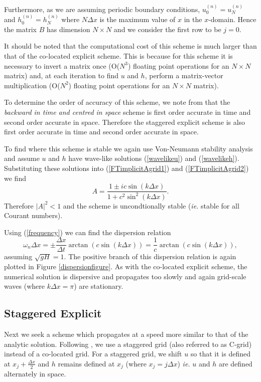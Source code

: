 \documentclass[a4paper, 10pt, notitlepage]{article}
\begin{document}
Furthermore, as we are assuming periodic boundary conditions, $u_{0}^{(n)} = u_{N}^{(n)}$ and $h_{0}^{(n)} = h_{N}^{(n)}$ where $N\Delta x$ is the maximum value of $x$ in the $x$-domain. Hence the matrix $B$ has dimension $N \times N$ and we consider the first row to be $j = 0$. 

It should be noted that the computational cost of this scheme is much larger than that of the co-located explicit scheme. This is because for this scheme it is necessary to invert a matrix once (O($N^{3}$) floating point operations for an $N \times N$ matrix) and, at each iteration to find $u$ and $h$, perform a matrix-vector multiplication (O($N^{2}$) floating point operations for an $N \times N$ matrix). 

To determine the order of accuracy of this scheme, we note from \cite{MPE textbook} that the \textit{backward in time and centred in space} scheme is first order accurate in time and second order accurate in space. Therefore the staggered explicit scheme is also first order accurate in time and second order accurate in space.

To find where this scheme is stable we again use Von-Neumann stability analysis and assume $u$ and $h$ have wave-like solutions (\ref{wavelikeu}) and (\ref{wavelikeh}). Substituting these solutions into (\ref{FTimplicitAgrid1}) and (\ref{FTimplicitAgrid2}) we find
\begin{equation}
A = \frac{1 \pm i c\sin(k\Delta x)}{1 + c^{2}\sin^{2}(k\Delta x)}.
\end{equation}
Therefore $\lvert A \rvert ^{2} < 1$ and the scheme is uncondtionally stable (\textit{ie.} stable for all Courant numbers). 

Using (\ref{frequency}) we can find the dispersion relation
\begin{equation}
\omega_{n} \Delta x = \pm\frac{\Delta x}{\Delta t} \arctan(c\sin(k\Delta x)) = \frac{1}{c}  \arctan(c\sin(k\Delta x)),
\end{equation}
assuming $\sqrt{gH} = 1$. The positive branch of this dispersion relation is again plotted in Figure \ref{dispersionfigure}. As with the co-located explicit scheme, the numerical solution is dispersive and propagates too slowly and again grid-scale waves (where $k\Delta x = \pi$) are stationary. 

\subsection{Staggered Explicit}
Next we seek a scheme which propagates at a speed more similar to that of the analytic solution. Following \cite{MPE textbook}, we use a staggered grid (also referred to as C-grid) instead of a co-located grid. For a staggered grid, we shift $u$ so that it is defined at $x_{j} + \frac{\Delta x}{2}$ and $h$ remains defined at $x_{j}$ (where $x_{j} = j \Delta x$) \textit{ie.} $u$ and $h$ are defined alternately in space.
\end{document}
